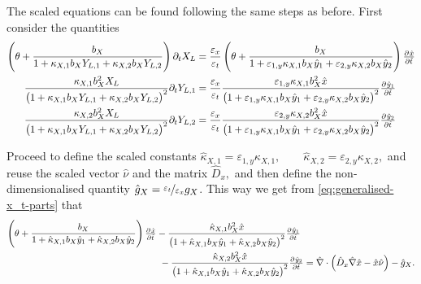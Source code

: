 \documentclass[11pt]{article}
\numberwithin{equation}{section}
\begin{document}
The scaled equations can be found following the same steps as before. First consider the quantities
\begin{subequations}
\label{eq:generalised-x_t-parts}
\begin{align}
    \left( \theta + \frac{b_X}{1 + \kappa_{X,1} b_{X} Y_{L,1} + \kappa_{X,2} b_{X} Y_{L,2}} \right) \partial_t X_L &= \frac{\varepsilon_x}{\varepsilon_t} \left( \theta + \frac{b_X}{1 + \varepsilon_{1,y} \kappa_{X,1} b_{X} \hat{y}_1 + \varepsilon_{2,y} \kappa_{X,2} b_{X} \hat{y}_2 } \right)  \pd{\hat{x}}{\hat{t}}
    \\
    \frac{\kappa_{X,1} b_X^2 X_L}{\big(1 + \kappa_{X,1} b_{X} Y_{L,1} + \kappa_{X,2} b_{X} Y_{L,2} \big)^2} \partial_t Y_{L,1} 
    &=
    \frac{\varepsilon_x}{\varepsilon_t} \frac{\varepsilon_{1,y} \kappa_{X,1} b_X^2 \hat{x}}{\big(1+ \varepsilon_{1,y} \kappa_{X,1} b_X \hat{y}_1 + \varepsilon_{2,y} \kappa_{X,2} b_X \hat{y}_2 \big)^2} \pd{\hat y_1}{\hat t}
    \\
    \frac{ \kappa_{X,2} b_X^2 X_L }{\big(1 + \kappa_{X,1} b_X Y_{L,1} + \kappa_{X,2} b_X Y_{L,2}\big)^2} \partial_t Y_{L,2}
    &=
    \frac{\varepsilon_x}{\varepsilon_t} \frac{\varepsilon_{2,y} \kappa_{X,2} b_X^2 \hat{x}}{\big(1+ \varepsilon_{1,y} \kappa_{X,1} b_X \hat{y}_1 + \varepsilon_{2,y} \kappa_{X,2} b_X \hat{y}_2 \big)^2} \pd{\hat y_2}{\hat t}
\end{align}
\end{subequations}


Proceed to define the scaled constants
\(
    \hat{\kappa}_{X,1} = \varepsilon_{1,y} \kappa_{X,1},
    \qquad
    \hat{\kappa}_{X,2} = \varepsilon_{2,y} \kappa_{X,2},
\) and reuse the scaled vector \(\hat{\nu}\) and the matrix
\(
    \hat{D}_x ,
\)
and then define the non-dimensionalised quantity \( \hat{g}_X = \nicefrac{\varepsilon_t}{\varepsilon_x} g_X\). This way we get from \eqref{eq:generalised-x_t-parts} that
\begin{equation}
\begin{aligned}
    \left( \theta + \frac{b_X}{1 + \hat{\kappa}_{X,1} b_{X} \hat{y}_1 + \hat{\kappa}_{X,2} b_{X} \hat{y}_2 } \right)  \pd{\hat{x}}{\hat{t}}
    &
    -\frac{\hat{\kappa}_{X,1} b_X^2 \hat{x}}{\big(1+ \hat{\kappa}_{X,1} b_X \hat{y}_1 + \hat{\kappa}_{X,2} b_X \hat{y}_2 \big)^2} \pd{\hat y_1}{\hat t}
    \\
    &\,\,
    -\frac{\hat{\kappa}_{X,2} b_X^2 \hat{x}}{\big(1+ \hat{\kappa}_{X,1} b_X \hat{y}_1 + \hat{\kappa}_{X,2} b_X \hat{y}_2 \big)^2} \pd{\hat y_2}{\hat t}
    =
    \hat{\nabla}
    \cdot
    \left( 
        \hat{D}_x \hat{\nabla} \hat{x} - \hat{x} \hat{\nu}
    \right)
    - \hat{g}_X.
\end{aligned}
\end{equation}
\end{document}
